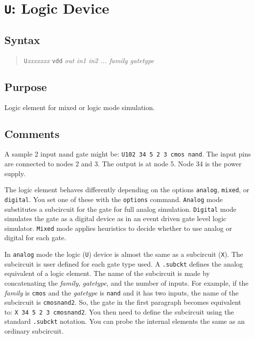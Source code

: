 \section{{\tt U}: Logic Device}
\subsection{Syntax}
\begin{verse}
{\tt U}{\it xxxxxxx} {\tt vdd} {\it out in1 in2 ... family gatetype}
\end{verse}
\subsection{Purpose}

Logic element for mixed or logic mode simulation.
\subsection{Comments}

A sample 2 input nand gate might be: {\tt U102 34 5 2 3 cmos nand}.  The
input pins are connected to nodes 2 and 3.  The output is at node 5.  Node
34 is the power supply.

The logic element behaves differently depending on the options {\tt analog},
{\tt mixed}, or {\tt digital}.  You set one of these with the {\tt options}
command.  {\tt Analog} mode substitutes a subcircuit for the gate for full
analog simulation.  {\tt Digital} mode simulates the gate as a digital
device as in an event driven gate level logic simulator.  {\tt Mixed} mode
applies heuristics to decide whether to use analog or digital for each gate.

In {\tt analog} mode the logic ({\tt U}) device is almost the same as a
subcircuit ({\tt X}).  The subcircuit is user defined for each gate type
used.  A {\tt .subckt} defines the analog equivalent of a logic element.
The name of the subcircuit is made by concatenating the {\em family}, {\em
gatetype}, and the number of inputs.  For example, if the {\em family} is
{\tt cmos} and the {\em gatetype} is {\tt nand} and it has two inputs, the
name of the subcircuit is {\tt cmosnand2}.  So, the gate in the first
paragraph becomes equivalent to: {\tt X 34 5 2 3 cmosnand2}.  You then need
to define the subcircuit using the standard {\tt .subckt} notation.  You can
probe the internal elements the same as an ordinary subcircuit.

